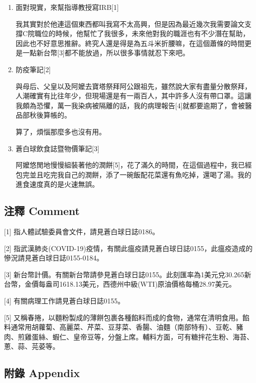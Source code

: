 \documentclass[a5paper, 12pt
]{book}
\begin{document}
\begin{enumerate}
\def\labelenumi{\arabic{enumi}.}
\item
  面對現實，來幫指導教授寫IRB{[}1{]}

  我其實對於他連這個東西都叫我寫不太高興，但是因為最近幾次我需要論文支撐C院職位的時候，他幫忙了我很多，未來他對我的職涯也有不少潛在幫助，因此也不好意思推辭。終究人還是得是為五斗米折腰嘛，在這個蕭條的時間更是一點新台幣{[}3{]}都不能放過，所以很多事情就忍下來吧。
\item
  防疫筆記{[}2{]}

  與母后、父皇以及阿嬤去寶塔祭拜阿公跟祖先，雖然說大家有盡量分散祭拜，人潮確實有比往年少，但現場還是有一兩百人，其中許多人沒有帶口罩。這讓我頗為恐懼，萬一我染病被隔離的話，我的病理報告{[}4{]}就都要逾期了，會被醫品部秋後算帳的。

  算了，煩惱那麼多也沒有用。
\item
  蒼白球飲食誌暨物價筆記{[}3{]}

  阿嬤悠閒地慢慢組裝著他的潤餅{[}5{]}，花了滿久的時間，在這個過程中，我已經包完並且吃完我自己的潤餅，添了一碗飯配花菜還有魚吃掉，還喝了湯。我的進食速度真的是火速無誤。
\end{enumerate}

\hypertarget{ux6ce8ux91cb-comment-34}{%
\subsection{注釋 Comment}\label{ux6ce8ux91cb-comment-34}}

{[}1{]} 指人體試驗委員會文件，請見蒼白球日誌0186。

{[}2{]}
指武漢肺炎(COVID-19)疫情，有關此瘟疫請見蒼白球日誌0155，此瘟疫造成的慘況請見蒼白球日誌0155-0184。

{[}3{]}
新台幣計價。有關新台幣請參見蒼白球日誌0155。此刻匯率為1美元兌30.265新台幣，金價每盎司1618.13美元，西德州中級(WTI)原油價格每桶28.97美元。

{[}4{]} 有關病理工作請見蒼白球日誌0155。

{[}5{]}
又稱春捲，以麵粉製成的薄餅包裹各種餡料而成的食物，通常在清明食用。餡料通常用胡蘿蔔、高麗菜、芹菜、豆芽菜、香腸、油麵（南部特有）、豆乾、豬肉、煎雞蛋絲、蝦仁、皇帝豆等，分盤上席。輔料方面，可有糖拌花生粉、海苔、蔥、蒜、芫荽等。

\hypertarget{ux9644ux9304-appendix-34}{%
\subsection{附錄 Appendix}\label{ux9644ux9304-appendix-34}}
\end{document}
